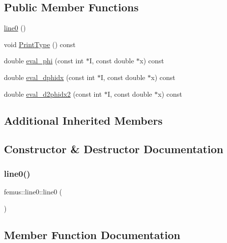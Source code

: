 \subsection*{Public Member Functions}
\begin{DoxyCompactItemize}
\item 
\mbox{\hyperlink{classfemus_1_1line0_aa14d26a70dd9180e7e56e9b54d6c219a}{line0}} ()
\item 
void \mbox{\hyperlink{classfemus_1_1line0_a34e5a0791c0d6fe2d4fd3caf2bb51ff2}{Print\+Type}} () const
\item 
double \mbox{\hyperlink{classfemus_1_1line0_a6e491417e4678a7d982bd8a4e2b1d4ea}{eval\+\_\+phi}} (const int $\ast$I, const double $\ast$x) const
\item 
double \mbox{\hyperlink{classfemus_1_1line0_a9c111514d616c479847a26b0b341ca18}{eval\+\_\+dphidx}} (const int $\ast$I, const double $\ast$x) const
\item 
double \mbox{\hyperlink{classfemus_1_1line0_accd6354291c1f1f8d91bc5e68087e9eb}{eval\+\_\+d2phidx2}} (const int $\ast$I, const double $\ast$x) const
\end{DoxyCompactItemize}
\subsection*{Additional Inherited Members}


\subsection{Constructor \& Destructor Documentation}
\mbox{\label{classfemus_1_1line0_aa14d26a70dd9180e7e56e9b54d6c219a}} 
\subsubsection{\texorpdfstring{line0()}{line0()}}
{\footnotesize\ttfamily femus\+::line0\+::line0 (\begin{DoxyParamCaption}{ }\end{DoxyParamCaption})\hspace{0.3cm}{\ttfamily [inline]}}



\subsection{Member Function Documentation}
\mbox{\label{classfemus_1_1line0_accd6354291c1f1f8d91bc5e68087e9eb}} 
